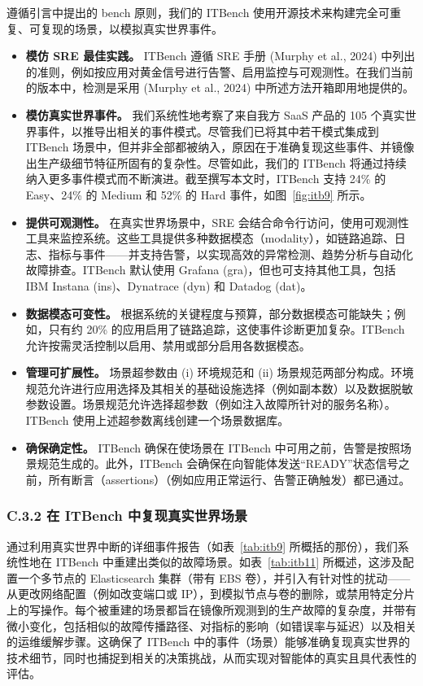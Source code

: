 \documentclass[10pt,UTF8,fontset=fandol]{ctexart}
\begin{document}
遵循引言中提出的 bench 原则，我们的 ITBench 使用开源技术来构建完全可重复、可复现的场景，以模拟真实世界事件。

\begin{itemize}
\item \textbf{模仿 SRE 最佳实践。} ITBench 遵循 SRE 手册 (Murphy et al., 2024) 中列出的准则，例如按应用对黄金信号进行告警、启用监控与可观测性。在我们当前的版本中，检测是采用 (Murphy et al., 2024) 中所述方法开箱即用地提供的。
\item \textbf{模仿真实世界事件。} 我们系统性地考察了来自我方 SaaS 产品的 105 个真实世界事件，以推导出相关的事件模式。尽管我们已将其中若干模式集成到 ITBench 场景中，但并非全部都被纳入，原因在于准确复现这些事件、并镜像出生产级细节特征所固有的复杂性。尽管如此，我们的 ITBench 将通过持续纳入更多事件模式而不断演进。截至撰写本文时，ITBench 支持 24\% 的 Easy、24\% 的 Medium 和 52\% 的 Hard 事件，如图~\ref{fig:itb9} 所示。
\item \textbf{提供可观测性。} 在真实世界场景中，SRE 会结合命令行访问，使用可观测性工具来监控系统。这些工具提供多种数据模态（modality），如链路追踪、日志、指标与事件——并支持告警，以实现高效的异常检测、趋势分析与自动化故障排查。ITBench 默认使用 Grafana (gra)，但也可支持其他工具，包括 IBM Instana (ins)、Dynatrace (dyn) 和 Datadog (dat)。
\item \textbf{数据模态可变性。} 根据系统的关键程度与预算，部分数据模态可能缺失；例如，只有约 20\% 的应用启用了链路追踪，这使事件诊断更加复杂。ITBench 允许按需灵活控制以启用、禁用或部分启用各数据模态。
\item \textbf{管理可扩展性。} 场景超参数由 (i) 环境规范和 (ii) 场景规范两部分构成。环境规范允许进行应用选择及其相关的基础设施选择（例如副本数）以及数据脱敏参数设置。场景规范允许选择超参数（例如注入故障所针对的服务名称）。ITBench 使用上述超参数离线创建一个场景数据库。
\item \textbf{确保确定性。} ITBench 确保在使场景在 ITBench 中可用之前，告警是按照场景规范生成的。此外，ITBench 会确保在向智能体发送“READY”状态信号之前，所有断言（assertions）（例如应用正常运行、告警正确触发）都已通过。
\end{itemize}

\subsubsection{C.3.2 在 ITBench 中复现真实世界场景}

通过利用真实世界中断的详细事件报告（如表~\ref{tab:itb9} 所概括的那份），我们系统性地在 ITBench 中重建出类似的故障场景。如表~\ref{tab:itb11} 所概述，这涉及配置一个多节点的 Elasticsearch 集群（带有 EBS 卷），并引入有针对性的扰动——从更改网络配置（例如改变端口或 IP），到模拟节点与卷的删除，或禁用特定分片上的写操作。每个被重建的场景都旨在镜像所观测到的生产故障的复杂度，并带有微小变化，包括相似的故障传播路径、对指标的影响（如错误率与延迟）以及相关的运维缓解步骤。这确保了 ITBench 中的事件（场景）能够准确复现真实世界的技术细节，同时也捕捉到相关的决策挑战，从而实现对智能体的真实且具代表性的评估。
\end{document}

